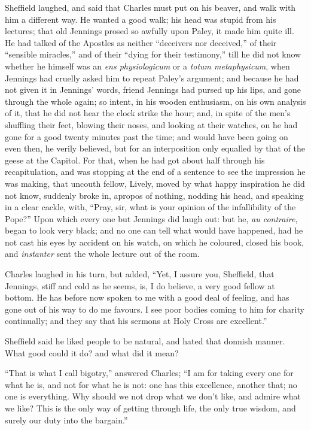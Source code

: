 Sheffield laughed, and said that Charles must put on his beaver,
and walk with him a different way. He wanted a good walk; his head was
stupid from his lectures; that old Jennings prosed so awfully upon
Paley, it made him quite ill. He had talked of the Apostles as neither
``deceivers nor deceived,'' of their ``sensible
miracles,'' and of their ``dying for their testimony,''
till he did not know whether he himself was an \emph{ens physiologicum}
or a \emph{totum metaphysicum}, when Jennings had cruelly asked him to
repeat Paley's argument; and because he had not given it in Jennings'
words, friend Jennings had pursed up his lips, and gone through the
whole again; so intent, in his wooden enthusiasm, on his own analysis
of it, that he did not hear the clock strike the hour; and, in spite
of the men's shuffling their feet, blowing their noses, and looking at
their watches, on he had gone for a good twenty minutes past the time;
and would have been going on even then, he verily believed, but for an
interposition only equalled by that of the geese at the Capitol. For
that, when he had got about half through his recapitulation, and was
stopping at the end of a sentence to see the impression he was making,
that uncouth fellow, Lively, moved by what happy inspiration he did
not know, suddenly broke in, apropos of nothing, nodding his head, and
speaking in a clear cackle, with, ``Pray, sir, what is your
opinion of the infallibility of the Pope?'' Upon which every one
but Jennings did laugh out: but he, \emph{au contraire}, began to look very black; and no one can tell what would have happened, had he
not cast his eyes by accident on his watch, on which he coloured,
closed his book, and \emph{instanter} sent the whole lecture out of
the room.

Charles laughed in his turn, but added, ``Yet, I assure you,
Sheffield, that Jennings, stiff and cold as he seems, is, I do
believe, a very good fellow at bottom. He has before now spoken to me
with a good deal of feeling, and has gone out of his way to do me
favours. I see poor bodies coming to him for charity continually; and
they say that his sermons at Holy Cross are excellent.''

Sheffield said he liked people to be natural, and hated that
donnish manner. What good could it do? and what did it mean?

``That is what I call bigotry,'' answered Charles; ``I
am for taking every one for what he is, and not for what he is not:
one has this excellence, another that; no one is everything. Why
should we not drop what we don't like, and admire what we like? This
is the only way of getting through life, the only true wisdom, and
surely our duty into the bargain.''

